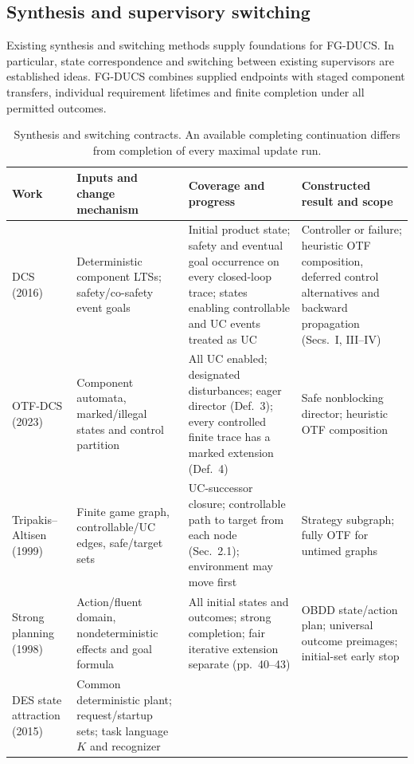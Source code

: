 \documentclass[11pt]{article}
\begin{document}
\subsection{Synthesis and supervisory switching}
Existing synthesis and switching methods supply foundations for FG-DUCS. In particular, state correspondence and switching between existing supervisors are established ideas. FG-DUCS combines supplied endpoints with staged component transfers, individual requirement lifetimes and finite completion under all permitted outcomes.
\begin{table}[!htbp]
\caption{Synthesis and switching contracts. An available completing continuation differs from completion of every maximal update run.}
\label{tab:supp-foundations}
\centering\footnotesize
\setlength{\tabcolsep}{3pt}\renewcommand{\arraystretch}{1.05}
\begin{tabular}{@{}>{\raggedright\arraybackslash}p{.15\linewidth}>{\raggedright\arraybackslash}p{.28\linewidth}>{\raggedright\arraybackslash}p{.29\linewidth}>{\raggedright\arraybackslash}p{.23\linewidth}@{}}
\toprule
Work & Inputs and change mechanism & Coverage and progress & Constructed result and scope\\
\midrule
DCS (2016)
& Deterministic component LTSs; safety/co-safety event goals
& Initial product state; safety and eventual goal occurrence on every closed-loop trace; states enabling controllable and UC events treated as UC
& Controller or failure; heuristic OTF composition, deferred control alternatives and backward propagation (Secs.~I, III--IV)\\
OTF-DCS (2023)
& Component automata, marked/illegal states and control partition
& All UC enabled; designated disturbances; eager director (Def.~3); every controlled finite trace has a marked extension (Def.~4)
& Safe nonblocking director; heuristic OTF composition\\
Tripakis--Altisen (1999)
& Finite game graph, controllable/UC edges, safe/target sets
& UC-successor closure; controllable path to target from each node (Sec.~2.1); environment may move first
& Strategy subgraph; fully OTF for untimed graphs\\
Strong planning (1998)
& Action/fluent domain, nondeterministic effects and goal formula
& All initial states and outcomes; strong completion; fair iterative extension separate (pp.~40--43)
& OBDD state/action plan; universal outcome preimages; initial-set early stop\\
DES state attraction (2015)
& Common deterministic plant; request/startup sets; task language $K$ and recognizer

\end{tabular}
\end{table}
\end{document}

